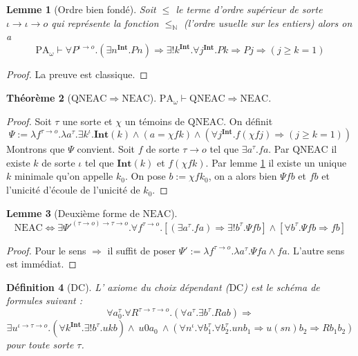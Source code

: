 \documentclass[a4paper,12pt]{article}
\newtheorem{theo}{Théorème}[subsection]
\newtheorem{defi}[theo]{Définition}
\newtheorem{lem}[theo]{Lemme}
\theoremstyle{rmqstyle}
\newcommand{\N}{\mathbb{N}}
\newcommand{\PA}{\mathrm{PA}}
\renewcommand{\int}{\mathbf{Int}}
\renewcommand{\implies}{\Rightarrow}
\renewcommand{\iff}{\Leftrightarrow}
\newcommand{\QNEAC}{\mathrm{QNEAC}}
\newcommand{\NEAC}{\mathrm{NEAC}}
\newcommand{\DC}{\mathrm{DC}}
\begin{document}
\begin{lem}[Ordre bien fondé]
\label{ordre bf}
Soit $\leq$ le terme d'ordre supérieur de sorte $\iota \to \iota \to o$ qui représente la fonction $\leq_\N$ (l'ordre usuelle sur les entiers) alors on a
$$\PA_\omega \vdash \forall P^{\iota \to o}. (\exists n^\int. Pn) \implies \exists ! k^\int. \forall j^\int. Pk \implies Pj \implies (j \geq k = 1)$$
\end{lem}

\begin{proof}
La preuve est classique.
\end{proof}


\begin{theo}[$\QNEAC \implies \NEAC$]
$\PA_\omega \vdash \QNEAC \implies \NEAC$.
\end{theo}

\begin{proof}
Soit $\tau$ une sorte et $\chi$ un témoins de $\QNEAC$. On définit
$$\Psi := \lambda f^{\tau \to o}. \lambda a^\tau. \exists k^\iota. \int(k) \land (a = \chi f k) \land (\forall j^\int. f( \chi f j ) \implies (j \geq k = 1))$$
Montrons que $\Psi$ convient. Soit $f$ de sorte $\tau \to o$ tel que $\exists a^\tau. fa$. Par $\QNEAC$ il existe $k$ de sorte $\iota$ tel que $\int(k)$ et $f( \chi f k)$. Par lemme \ref{ordre bf} il existe un unique $k$ minimale qu'on appelle $k_0$. On pose $b := \chi f k_0$, on a alors bien $\Psi f b$ et $f b$ et l'unicité d'écoule de l'unicité de $k_0$.
\end{proof}

\begin{lem}[Deuxième forme de $\NEAC$]
\label{NEAC 2}
$$\NEAC \iff \exists \Psi'^{(\tau \to o) \to \tau \to o}. \forall f^{\tau \to o}.[( \exists a^\tau. fa) \implies \exists ! b^\tau.\Psi f b] \land [\forall b^\tau. \Psi f b \implies fb]$$
\end{lem}

\begin{proof}
Pour le sens $\implies$ il suffit de poser $\Psi' := \lambda f^{\tau \to o}. \lambda a^\tau. \Psi f a \land fa$. L'autre sens est immédiat. 
\end{proof}


\begin{defi}[$\DC$]
L' axiome du choix dépendant ($\DC$) est le schéma de formules suivant :
$$\forall a_0^\tau. \forall R^{\tau \to \tau \to o}. (\forall a^\tau. \exists b^\tau. R a b) \implies$$
$$ \exists u^{\iota \to \tau \to o}.  (\forall k^\int. \exists ! b^\tau. ukb)  \land  \ u 0 a_0 \ \land (\forall n^\iota. \forall b_1^\tau. \forall b_2^\tau. u n b_1 \implies u (sn) b_2 \implies R b_1 b_2)$$
pour toute sorte $\tau$. 
\end{defi}
\end{document}
